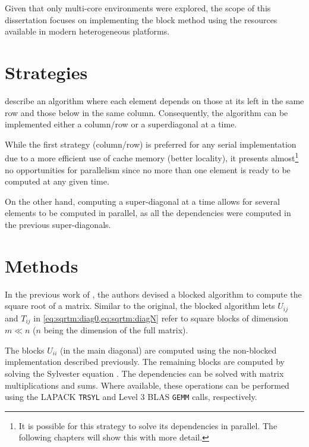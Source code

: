\documentclass[../thesis]{subfiles}
\begin{document}
  Given that only multi-core environments were explored, the scope of this dissertation focuses on implementing the block method using  the resources available in modern heterogeneous platforms.

	\section{Strategies}
		 describe an algorithm where each element depends on those at its left in the same row and those below in the same column. Consequently, the algorithm can be implemented either a column/row or a superdiagonal at a time.

		While the first strategy (column/row) is preferred for any serial implementation due to a more efficient use of cache memory (better locality), it presents almost\footnote{It is possible for this strategy to solve its dependencies in parallel. The following chapters will show this with more detail.} no opportunities for parallelism since no more than one element is ready to be computed at any given time.

		On the other hand, computing a super-diagonal at a time allows for several elements to be computed in parallel, as all the dependencies were computed in the previous super-diagonals.

	\section{Methods}
		In the previous work of \citeauthor{Deadman:Higham:Ralha:2013}\xspace\cite{Deadman:Higham:Ralha:2013}, the authors devised a blocked algorithm to compute the square root of a matrix. Similar to the original, the blocked algorithm lets $U_{ij}$ and $T_{ij}$ in \cref{eq:sqrtm:diag0,eq:sqrtm:diagN} refer to square blocks of dimension $m \ll n$ ($n$ being the dimension of the full matrix).

		The blocks $U_{ii}$ (in the main diagonal) are computed using the non-blocked implementation described previously.
		The remaining blocks are computed by solving the Sylvester equation .
		The dependencies can be solved with matrix multiplications and sums.
		Where available, these operations can be performed using the LAPACK \texttt{TRSYL} and Level 3 BLAS \texttt{GEMM} calls, respectively.
\end{document}
